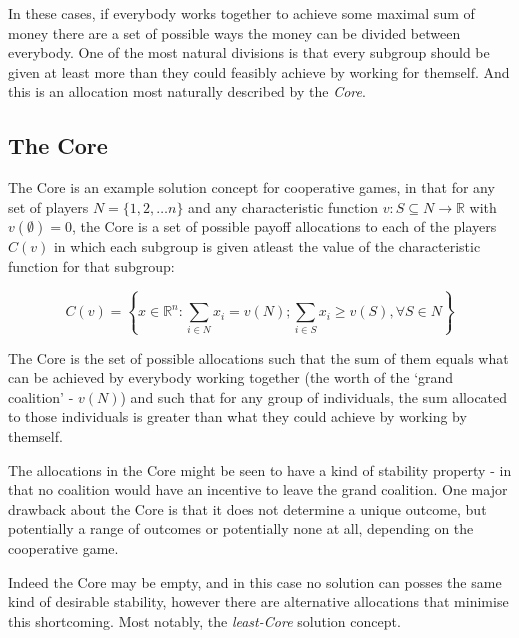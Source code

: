 In these cases, if everybody works together to achieve some maximal sum of money there are a set of possible ways the money can be divided between everybody.
One of the most natural divisions is that every subgroup should be given at least more than they could feasibly achieve by working for themself.
And this is an allocation most naturally described by the \textit{Core}.

\subsection{The Core}

The Core is an example solution concept for cooperative games, in that for any set of players $N=\{1,2,\dots n\}$ and any characteristic function $v: S\subseteq N \rightarrow \mathbb{R}$ with $v(\emptyset)=0$, the Core is a set of possible payoff allocations to each of the players $C(v)$ in which each subgroup is given atleast the value of the characteristic function for that subgroup:

$$ C(v) = \left\{x\in\mathbb{R}^n : \sum_{i\in N}x_i=v(N); \sum_{i\in S}x_i \ge v(S), \forall S\in N \right\}$$

The Core is the set of possible allocations such that the sum of them equals what can be achieved by everybody working together (the worth of the `grand coalition' - $v(N)$) and such that for any group of individuals, the sum allocated to those individuals is greater than what they could achieve by working by themself.

The allocations in the Core might be seen to have a kind of stability property - in that no coalition would have an incentive to leave the grand coalition. One major drawback about the Core is that it does not determine a unique outcome, but potentially a range of outcomes or potentially none at all, depending on the cooperative game.

Indeed the Core may be empty, and in this case no solution can posses the same kind of desirable stability, however there are alternative allocations that minimise this shortcoming.
Most notably, the \textit{least-Core} solution concept.

